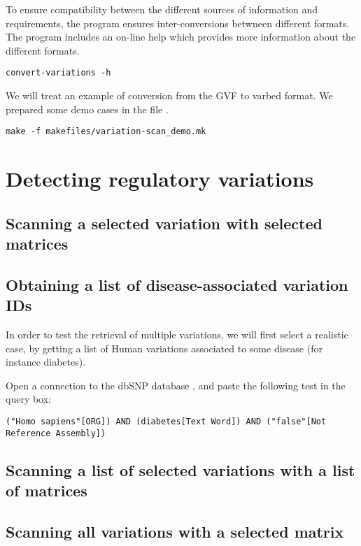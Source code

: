 To ensure compatibility between the different sources of information
and \RSAT requirements, the program 
ensures inter-conversions betwneen different formats. The program
includes an on-line help which provides more information about the
different formats.

\begin{lstlisting}
convert-variations -h
\end{lstlisting}


We will treat an example of conversion from the GVF to varbed
format. We prepared some demo cases in the file
.

\begin{lstlisting}
make -f makefiles/variation-scan_demo.mk
\end{lstlisting}
\tbw

\section{Detecting regulatory variations}

\subsection{Scanning a selected variation with selected matrices}

\tbw

\subsection{Obtaining a list of disease-associated variation IDs}

In order to test the retrieval of multiple variations, we will first
select a realistic case, by getting a list of Human variations
associated to some disease (for instance diabetes).

Open a connection to the dbSNP database
, and paste the following
test in the query box:

\begin{lstlisting}
("Homo sapiens"[ORG]) AND (diabetes[Text Word]) AND ("false"[Not Reference Assembly])
\end{lstlisting}

\tbw


\subsection{Scanning a list of selected variations with a list of matrices}

\tbw

\subsection{Scanning all variations with a selected matrix}

\tbw



